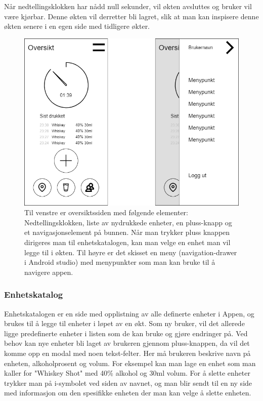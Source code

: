 Når nedtellingsklokken har nådd null sekunder, vil økten avsluttes og bruker vil være kjørbar. Denne økten vil derretter bli lagret, slik at man kan inspisere denne økten senere i en egen side med tidligere økter. 

\begin{figure}[H]
    \centering
    \includegraphics[scale=0.4]{images/lille_promille_frontpage.drawio.png}
    \caption{Til venstre er oversiktssiden med følgende elementer: Nedtellingsklokken, liste av nydrukkede enheter, en pluss-knapp og et navigasjonselement på bunnen. Når man trykker pluss knappen dirigeres man til enhetskatalogen, kan man velge en enhet man vil legge til i økten. Til høyre er det skisset en meny (navigation-drawer i Android studio) med menypunkter som man kan bruke til å navigere appen.}
\end{figure}

\subsubsection{Enhetskatalog}
Enhetskatalogen er en side med opplistning av alle definerte enheter i Appen, og brukes til å legge til enheter i løpet av en økt. Som ny bruker, vil det allerede ligge predefinerte enheter i listen som de kan bruke og gjøre endringer på. Ved behov kan nye enheter bli laget av brukeren gjennom pluss-knappen, da vil det komme opp en modal med noen tekst-felter. Her må brukeren beskrive navn på enheten, alkoholprosent og volum. For eksempel kan man lage en enhet som man kaller for "Whiskey Shot" med 40\% alkohol og 30ml volum. For å slette enheter trykker man på i-symbolet ved siden av navnet, og man blir sendt til en ny side med informasjon om den spesifikke enheten der man kan velge å slette enheten.

